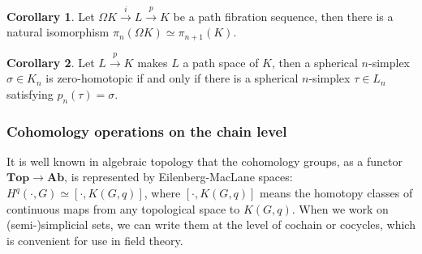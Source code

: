 \documentclass[reprint, amsmath, amssymb, showpacs, floatfix, longbibliography, aps, twocolumn, superscriptaddress, nofootinbib]{revtex4-2}
\theoremstyle{definition}
\newtheorem{corollary}{Corollary}[section]
\begin{document}
\begin{corollary}
	Let $\Omega K\xrightarrow{i} L\xrightarrow{p} K$ be a path fibration sequence,	then there is a natural isomorphism	$\pi_n(\Omega K)\simeq \pi_{n+1}(K)$.
\end{corollary}

\begin{corollary}\label{corollaryZeroHomotopic}
	Let $ L\xrightarrow{p} K$ makes $L$ a path space of $K$, then a spherical $n$-simplex $\sigma \in K_n$ is zero-homotopic if and only if there is a spherical $n$-simplex $\tau\in L_n$ satisfying $p_n(\tau)=\sigma$.
\end{corollary}

\subsubsection*{Cohomology operations on the chain level}

It is well known in algebraic topology that the cohomology groups, as a functor $\mathbf{Top}\rightarrow \mathbf{Ab}$, is represented by Eilenberg-MacLane spaces: $H^q(\cdot,G)\simeq [\cdot,K(G,q)]$, where $[\cdot,K(G,q)]$ means the homotopy classes of continuous maps from any topological space to $K(G,q)$. When we work on (semi-)simplicial sets, we can write them at the level of cochain or cocycles, which is convenient for use in field theory. 
\end{document}
